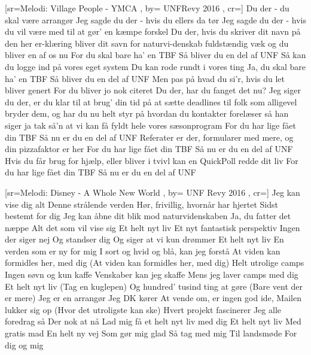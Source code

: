 \documentclass[pdftex,12pt]{article}
\begin{document}
\begin{songs}{}
[sr={Melodi: Village People - YMCA}
,
by={ UNFRevy 2016}
,
cr={}]\hypertarget{Din TBF}{}
\label{song88}
\beginverse
		Du der - du skal være arrangør
		Jeg sagde du der - hvis du ellers da tør
		Jeg sagde du der - hvis du vil være med
		til at gør' en kæmpe forskel
\endverse
\beginverse	
		Du der, hvis du skriver dit navn
		på den her er-klæring bliver dit savn
		for naturvi-denskab fuldstændig væk
		og du bliver en af os nu
\endverse
\beginverse	
		For du skal bare ha' en TBF
		Så bliver du en del af UNF
\endverse
\beginverse	
		Så kan du logge ind på vores eget system
		Du kan rode rundt i vores ting
\endverse
\beginverse	
		Ja, du skal bare ha' en TBF
		Så bliver du en del af UNF
\endverse
\beginverse	
		Men pas på hvad du si'r, hvis du let bliver genert
		For du bliver jo nok citeret
\endverse
\beginverse	
		Du der, har du fanget det nu?
		Jeg siger du der, er du klar til at brug'
		din tid på at sætte deadlines til folk
		som alligevel bryder dem, og
\endverse
\beginverse	
		har du nu helt styr på hvordan
		du kontakter forelæser så han
		siger ja tak så'n at vi kan få fyldt
		hele vores sæsonprogram
\endverse
\beginverse	
		For du har lige fået din TBF
		Så nu er du en del af UNF
\endverse
\beginverse	
		Referater er der, formularer med mere,
		og din pizzafaktor er her
\endverse
\beginverse	
		For du har lige fået din TBF
		Så nu er du en del af UNF
\endverse
\beginverse	
		Hvis du får brug for hjælp, eller bliver i tvivl
		kan en QuickPoll redde dit liv
\endverse
\beginverse	
		For du har lige fået din TBF
		Så nu er du en del af UNF
\endverse
\endsong


[sr={Melodi: Disney - A Whole New World}
,
by={ UNF Revy 2016}
,
cr={}]\hypertarget{Et helt nyt liv}{}
\label{song89}
\beginverse
        Jeg kan vise dig alt
		Denne strålende verden
		Hør, frivillig, hvornår har hjertet
		Sidst bestemt for dig
\endverse
\beginverse
        Jeg kan åbne dit blik
		mod naturvidenskaben
		Ja, du fatter det næppe
		Alt det som vil vise sig
\endverse
\beginverse
		Et helt nyt liv
		Et nyt fantastisk perspektiv
		Ingen der siger nej
		Og standser dig
		Og siger at vi kun drømmer
\endverse
\beginverse
		Et helt nyt liv
		En verden som er ny for mig
		I sort og hvid og blå, kan jeg forstå
		At viden kan formidles her, med dig
		(At viden kan formidles her, med dig)
\endverse
\beginverse
		Helt utrolige camps
		Ingen søvn og kun kaffe
		Venskaber kan jeg skaffe
		Mens jeg laver camps med dig
\endverse
\beginverse
		Et helt nyt liv
		(Tag en kuglepen)
		Og hundred' tusind ting at gøre
		(Bare vent der er mere)
		Jeg er en arrangør
		Jeg DK kører
		At vende om, er ingen god ide,
\endverse
\beginverse
        Mailen lukker sig op
		(Hvor det utroligste kan ske)
		Hvert projekt fascinerer
\endverse
\beginverse
		Jeg alle foredrag så
		Der nok at nå
		Lad mig få et helt nyt liv med dig
\endverse
\beginverse
		Et helt nyt liv
		Med gratis mad
		En helt ny vej
		Som gør mig glad
		Så tag med mig
		Til landsmøde
		For dig og mig
\endverse
\endsong



\end{songs}
\end{document}
